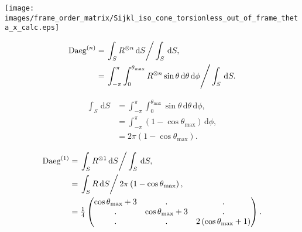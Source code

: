 \documentclass[a4paper,11pt,twoside,openright]{book}
\def\lthtmlcheckvsize{\ifdim\ht\sizebox<\vsize 
  \ifdim\wd\sizebox<\hsize\expandafter\hfill\fi \expandafter\vfill
  \else\expandafter\vss\fi}%
\begin{document}
{\newpage\clearpage
{}%
\texttt{[image: images/frame\_order\_matrix/Sijkl\_iso\_cone\_torsionless\_out\_of\_frame\_theta\_x\_calc.eps]}%
\lthtmlpictureZ
\lthtmlcheckvsize\clearpage}

{\newpage\clearpage
\setcounter{equation}{27}
%
\begin{subequations}\begin{align}
\textrm{Daeg}^{(n)}&= \left. \int_S R^{\otimes n} \,\mathrm{d}S \right / \int_S \,\mathrm{d}S , \\
&= \left. \int_{-\pi}^{\pi} \int_{0}^{\theta_{\textrm{max}}} R^{\otimes n} \sin\theta \,\mathrm{d}\theta \,\mathrm{d}\phi  \right / \int_S \,\mathrm{d}S .
\end{align}\end{subequations}%
\lthtmldisplayZ
\lthtmlcheckvsize\clearpage}

{\newpage\clearpage
\setcounter{equation}{28}
%
\begin{subequations}\begin{align}
\int_S \,\mathrm{d}S &= \int_{-\pi}^{\pi} \int_{0}^{\theta_{\textrm{max}}} \sin\theta \,\mathrm{d}\theta \,\mathrm{d}\phi , \\
&= \int_{-\pi}^{\pi} \left( 1 - \cos\theta_{\textrm{max}}\right) \,\mathrm{d}\phi , \\
&= 2\pi \left( 1 - \cos\theta_{\textrm{max}}\right) .
\end{align}\end{subequations}%
\lthtmldisplayZ
\lthtmlcheckvsize\clearpage}

{\newpage\clearpage
\setcounter{equation}{29}
%
\begin{subequations}\begin{align}
\textrm{Daeg}^{(1)}&= \left. \int_S R^{\otimes 1} \,\mathrm{d}S \right / \int_S \,\mathrm{d}S , \\
&= \left. \int_S R \,\mathrm{d}S \right / 2\pi \left( 1 - \cos\theta_{\textrm{max}}\right) , \\
&= \tfrac{1}{4}\begin{pmatrix}
\cos\theta_{\textrm{max}}+ 3 & .                     & . \\
.                     & \cos\theta_{\textrm{max}}+ 3 & . \\
.                     & .                     & 2\left( \cos\theta_{\textrm{max}}+ 1 \right) \\
\end{pmatrix} .
\end{align}\end{subequations}%
\lthtmldisplayZ
\lthtmlcheckvsize\clearpage}
\end{document}
